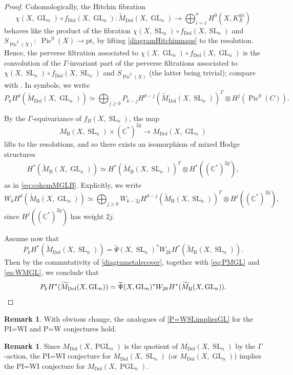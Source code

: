 \documentclass[JEP,XML,SOM,Unicode, NoEqCountersInSection,NoFloatCountersInSection,published]{cedram}
\theoremstyle{definition}
\newtheorem{rmk}[thm]{Remark}
\newcommand{\CC}{\mathbb{C}}
\newcommand{\Gl}{\operatorname{GL}}
\newcommand{\Sl}{\operatorname{SL}}
\newcommand{\PGl}{\operatorname{PGL}}
\newcommand{\Pic}{\operatorname{Pic}}
\newcommand{\MDolGl}{{M}_{\mathrm{Dol}}(X, \Gl_n)}
\newcommand{\MDolSl}{{M}_{\mathrm{Dol}}(X, \Sl_n)}
\newcommand{\MDolPGl}{{M}_{\mathrm{Dol}}(X, \PGl_n)}
\newcommand{\tMDolGl}{\widetilde{M}_{\mathrm{Dol}}(X, \Gl_n)}
\newcommand{\tMDolSl}{\widetilde{M}_{\mathrm{Dol}}(X, \Sl_n)}
\newcommand{\MBSl}{{M}_{\mathrm{B}}(X,\Sl_n)}
\newcommand{\tMBGl}{\widetilde{M}_{\mathrm{B}}(X,\Gl_n)}
\newcommand{\tMBSl}{\widetilde{M}_{\mathrm{B}}(X,\Sl_n)}
\begin{document}
\begin{proof}
Cohomologically, the Hitchin fibration
\[
\chi(X,\Gl_n) \circ f_{\mathrm{Dol}}(X, \Gl_n)\colon \tMDolGl \to \bigoplus_{i=1}^nH^0(X,K_X^{\otimes i})
\]
behaves like the product of the fibration
$\chi(X,\Sl_n) \circ f_{\mathrm{Dol}}(X, \Sl_n)$ and $S_{\Pic^0(X)}\colon$ $\Pic^0(X) \to \mathrm{pt}$, by lifting \eqref{diagramHitchinmaps} to the resolution. Hence, the perverse filtration associated to
$\chi(X, \Gl_n) \circ f_{\mathrm{Dol}}(X, \Gl_n)$ is the convolution of the $\Gamma$-invariant part of the perverse filtrations associated to $\chi(X, \Sl_n) \circ f_{\mathrm{Dol}}(X, \Sl_n)$ and $S_{\Pic^0(X)}$ (the latter being trivial); compare with \cite[\S 2.4]{deCataldoHauselMigliorini2012}. In symbols, we write
\begin{equation}\label{eq:PMGL}
P_kH^d( \tMDolGl) \simeq \bigoplus_{j\geq 0} P_{k-j}H^{d-j}(\tMDolSl)^{\Gamma}\otimes H^j(\Pic^0(C)).
\end{equation}

By the $\Gamma$-equivariance of $f_{B}(X, \Sl_n)$, the map
\[
\MBSl \times (\CC^{*})^{2g} \to \MDolGl
\]
lifts to the resolutions, and so there exists an isomorphism of mixed Hodge structures
\begin{align}
H^*(\tMBGl) \simeq H^*(\tMBSl)^{\Gamma} \otimes H^*( (\CC^{*})^{2g}), \label{eq:cohomtMGLB}
\end{align}
as in \eqref{eq:cohomMGLB}. Explicitly, we write
\begin{equation}\label{eq:WMGL}
W_{k}H^d(\tMBGl) \simeq \bigoplus_{j\geq 0} W_{k-2j}H^{d-j}(\tMBSl)^{\Gamma}\otimes H^j((\CC^*)^{2g}),
\end{equation}
since $H^j((\CC^*)^{2g})$ has weight $2j$.

Assume now that
\[
P_{k}H^*(\tMDolSl) = \widetilde{\Psi}(X, \Sl_n)^* W_{2k}H^*(\tMBSl).
\]
Then by the commutativity of \eqref{diagrametalecover}, together with \eqref{eq:PMGL} and \eqref{eq:WMGL}, we conclude that
\[
P_{k}H^*(\tMDolGl) = \widetilde{\Psi}(X, \Gl_n)^* W_{2k}H^*(\tMBGl).\qedhere
\]
\end{proof}

\begin{rmk}
With obvious change, the analogues of \cref{P=WSLimpliesGL} for the PI=WI and P=W conjectures hold.
\end{rmk}

\begin{rmk}\label{rmk:PGLn}
Since $\MDolPGl$ is the quotient of $\MDolSl$ by the $\Gamma$-action, the PI=WI conjecture for $\MDolSl$ (or $\MDolGl$) implies the PI=WI conjecture for $\MDolPGl$.
\end{rmk}
\end{document}
